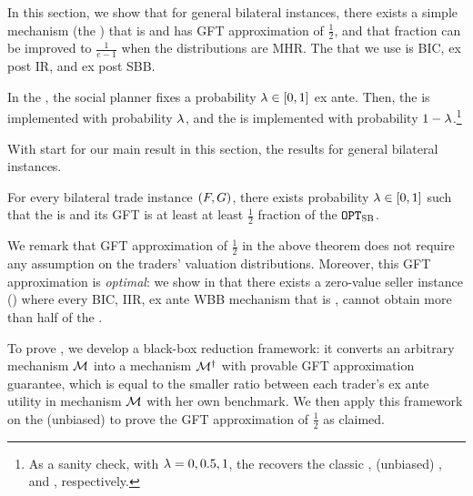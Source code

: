 
In this section, we show that for general bilateral instances, there exists a simple mechanism (the {\BiasedRandomOffer}) that is {\ksfair} and has GFT approximation of $\frac{1}{2}$, and that fraction can be improved to $\frac{1}{e-1}$ when the distributions are MHR. The {\BiasedRandomOffer} that we use is BIC, ex post IR, and ex post SBB. 
\begin{definition}[{\BROM}]
    \label{def:biased random offer}
    In the {\BiasedRandomOffer}, the social planner {fixes} a probability $\lambda\in[0, 1]$ {ex ante}. Then, the {\SellerOffer} is implemented with probability $\lambda$, and the {\BuyerOffer} is implemented with probability $1 - \lambda$.\footnote{As a sanity check, with $\lambda= 0, 0.5, 1$, the {\BiasedRandomOffer} recovers the classic {\BuyerOffer}, (unbiased) {\RandomOffer}, and {\SellerOffer}, respectively.}
\end{definition}
With start for our main result in this section, the results for general bilateral instances.


\begin{theorem}
\label{thm:optimal GFT:general instance}
\label{cor:biased random offer}
    For every bilateral trade instance $(F,G)$, there exists probability $\lambda\in[0, 1]$ such that the {\BiasedRandomOffer} is {\ksfair} and its GFT is at least at least $\frac{1}{2}$ fraction of the {\SecondBest} $\texttt{OPT}_{\textsc{SB}}$. 
\end{theorem}
We remark that GFT approximation of $\frac{1}{2}$ in the above theorem does not require any assumption on the traders' valuation distributions. Moreover, this GFT approximation is \emph{optimal}: we show in  that there exists a zero-value seller instance () where every BIC, IIR, ex ante WBB mechanism that is {\ksfair}, cannot obtain more than half of the {\SecondBest}.

To prove , we develop a black-box reduction framework: it converts an arbitrary mechanism $\mathcal{M}$ into a {\ksfair} mechanism $\mathcal{M}^\dagger$ with provable GFT approximation guarantee, which is equal to the smaller ratio between each trader's ex ante utility in mechanism $\mathcal{M}$ with her own benchmark. We then apply this framework on the (unbiased) {\RandomOffer} to prove the GFT approximation of $\frac{1}{2}$ 
as claimed.

